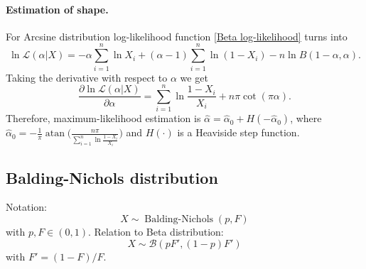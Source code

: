 \documentclass[a4paper,11pt]{article}
\theoremstyle{plain}
\theoremstyle{definition}
\begin{document}
	\paragraph{Estimation of shape.} For Arcsine distribution log-likelihood function \eqref{Beta log-likelihood} turns into
	\[
	\ln \mathcal{L} (\alpha | X) = -\alpha \sum_{i=1}^{n} \ln X_i + (\alpha - 1) \sum_{i=1}^{n}\ln (1-X_i) - n \ln B(1-\alpha, \alpha).
	\]
	Taking the derivative with respect to $\alpha$ we get
	\[ 
	\frac{\partial \ln\mathcal{L}(\alpha | X)}{\partial \alpha} = \sum_{i=1}^{n} \ln \frac{1-X_i}{X_i} + n\pi \cot(\pi \alpha).
	\]
	Therefore, maximum-likelihood estimation is $\hat{\alpha} = \hat{\alpha}_0 + H(-\hat{\alpha}_0)$, where $\hat{\alpha}_0 = -\frac{1}{\pi} \operatorname{atan}\Bigg(\frac{n\pi}{\sum_{i=1}^{n} \ln \frac{1-X_i}{X_i}}\Bigg)$ and $H(\cdot)$ is a Heaviside step function.
	
	\subsection{Balding-Nichols distribution}
	Notation: \[ X \sim \operatorname{Balding-Nichols}(p, F) \] with $p, F \in (0, 1)$.
	Relation to Beta distribution: \[ X \sim \mathcal{B}(pF', (1 - p)F') \] with $F' = (1 - F) / F$.
	
\end{document}
